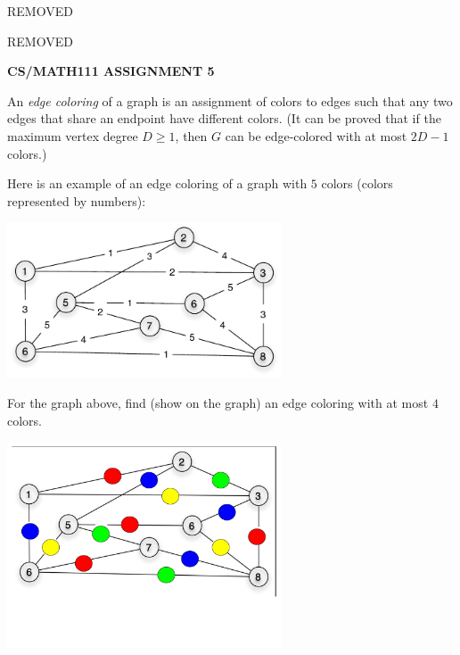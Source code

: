 \documentclass{article}
\begin{document}
\centerline{REMOVED}
\centerline{REMOVED}
\centerline{\large \bf CS/MATH111 ASSIGNMENT 5}


\vskip 0.15in


\vskip 0.15in




\begin{problem}
An \emph{edge coloring} of a graph is an
assignment of colors to edges such that any two
edges that share an endpoint have different colors. (It can be proved that if the maximum vertex degree $D \ge 1$, then $G$ can be edge-colored with at most $2D - 1$ colors.)

Here is an example of an edge coloring of
a graph with $5$ colors (colors represented by numbers):

\begin{center}
\includegraphics[width=3.2in]{HW5_pics/graph_edge_color_hw5.pdf}
\end{center}

\noindent
For the graph above, find (show on the graph) an edge coloring with at most $4$ colors.



\end{problem}

\begin{solution}

\begin{center}
\includegraphics[width=3.2in]{HW5_pics/problem1solution.pdf}
\end{center}

\end{solution}
\end{document}
